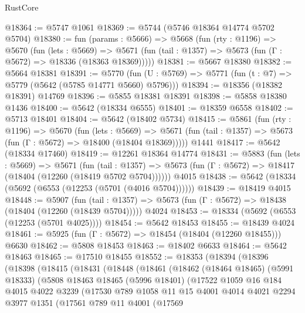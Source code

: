 \begin{lexlean}{RustCore}
\begin{coremodule}
@18364 := @5747 @1061
@18369 := @5744 (@5746 @18364 @14774 @5702 @5704)
@18380 := fun (params : @5666) =>
  @5668
    (fun (rty : @1196) =>
    @5670
      (fun (lets : @5669) =>
      @5671 (fun (tail : @1357) => @5673 (fun (Γ : @5672) => @18336 (@18363 @18369)))))
@18381 := @5667 @18380
@18382 := @5664 @18381
@18391 := @5770
    (fun (U : @5769) => @5771 (fun (t : @7) => @5779 (@5642 (@5785 @14771 @5660) @5796)))
@18394 := @18356 (@18382 @18391) @14769
@18396 := @5855 @18381 @18391
@18398 := @5858 @18380 @1436
@18400 := @5642 (@18334 @6555)
@18401 := @18359 @6558
@18402 := @5713 @18401
@18404 := @5642 (@18402 @5734)
@18415 := @5861
    (fun (rty : @1196) =>
    @5670
      (fun (lets : @5669) =>
      @5671 (fun (tail : @1357) => @5673 (fun (Γ : @5672) => @18400 (@18404 @18369)))))
    @1441
@18417 := @5642 (@18334 @17460)
@18419 := @12261 @18364 @14774
@18431 := @5883
    (fun (lets : @5669) =>
    @5671
      (fun (tail : @1357) =>
      @5673 (fun (Γ : @5672) => @18417 (@18404 (@12260 (@18419 @5702 @5704))))))
    @4015
@18438 := @5642 (@18334 (@5692 (@6553 (@12253 (@5701 (@4016 @5704))))))
@18439 := @18419 @4015
@18448 := @5907
    (fun (tail : @1357) => @5673 (fun (Γ : @5672) => @18438 (@18404 (@12260 (@18439 @5704)))))
    @4024
@18453 := @18334 (@5692 (@6553 (@12253 (@5701 @4025))))
@18454 := @5642 @18453
@18455 := @18439 @4024
@18461 := @5925 (fun (Γ : @5672) => @18454 (@18404 (@12260 @18455))) @6630
@18462 := @5808 @18453
@18463 := @18402 @6633
@18464 := @5642 @18463
@18465 := @17510 @18455
@18552 := @18353
    (@18394
      (@18396
        (@18398
          (@18415
            (@18431
              (@18448
                (@18461
                  (@18462
                    (@18464 @18465)
                    (@5991 @18333)
                    (@5808
                      @18463
                      @18465
                      (@5996 @18401)
                      (@17522
                        @1059
                        @16
                        @184
                        @4015
                        @4022
                        @3239
                        (@17530
                          @789
                          @1058
                          @11
                          @15
                          @4001
                          @4014
                          @4021
                          @2294
                          @3977
                          @1351
                          (@17561
                            @789
                            @11
                            @4001
                            (@17569

\end{coremodule}
\end{lexlean}
